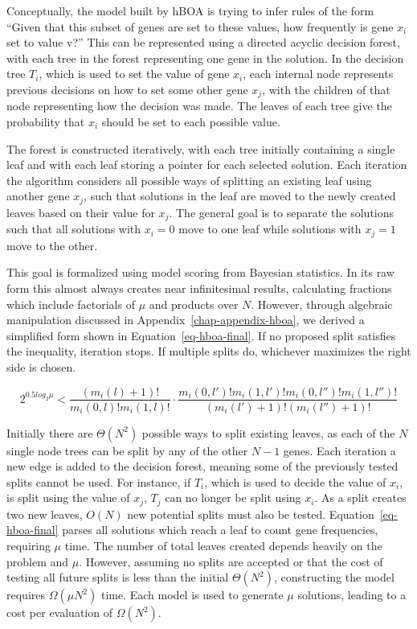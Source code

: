 Conceptually, the model built by hBOA is trying to infer rules of the form ``Given that this
subset of genes are set to these values, how frequently is gene $x_i$ set to value v?'' This can
be represented using a directed acyclic decision forest, with each tree in the forest representing one gene
in the solution. In the decision tree $T_i$, which is used to set the value of gene $x_i$,
each internal node represents previous decisions on how to set
some other gene $x_j$, with the children of that node representing how the decision was made. The
leaves of each tree give the probability that $x_i$ should be set to each possible value.

The forest is constructed iteratively, with each tree initially containing a single leaf
and with each leaf storing a pointer for each selected solution. Each iteration the algorithm considers
all possible ways of splitting an existing leaf using another gene $x_j$, such that solutions in the
leaf are moved to the newly created leaves based on their value for $x_j$. The general goal is to
separate the solutions such that all solutions with $x_i = 0$ move to one leaf while solutions with
$x_j = 1$ move to the other.

This goal is formalized using model scoring from Bayesian statistics. In its raw form this
almost always creates near infinitesimal results, calculating fractions which include factorials of $\mu$
and products over $N$. However, through algebraic manipulation discussed in Appendix~\ref{chap-appendix-hboa}, we
derived a simplified form shown in Equation~\ref{eq-hboa-final}. If no proposed split satisfies the inequality, iteration stops.
If multiple splits do, whichever maximizes the right side is chosen.

\begin{equation}
  2^{0.5 log_2\mu} < \frac{(m_i(l) + 1)!}{m_i(0, l)!m_i(1,l)!} \cdot
  \frac{m_i(0, l')!m_i(1,l')!m_i(0, l'')!m_i(1,l'')!}{(m_i(l') + 1)!(m_i(l'') + 1)!}
  \label{eq-hboa-final}
\end{equation}

Initially there are $\Theta(N^2)$ possible ways to split existing leaves, as each of the $N$ single node
trees can be split by any of the other $N-1$ genes. Each iteration a new edge is added to the decision
forest, meaning some of the previously tested splits cannot be used. For instance, if $T_i$, which is used
to decide the value of $x_i$, is split using the value of $x_j$, $T_j$ can no longer be split using $x_i$.
As a split creates two new leaves, $O(N)$ new potential splits must also be tested. Equation~\ref{eq-hboa-final}
parses all solutions which reach a leaf to count gene frequencies, requiring $\mu$ time.
The number of total leaves created depends heavily on the problem and $\mu$.
However, assuming no splits are accepted or that the cost of testing all future splits is less than
the initial $\Theta(N^2)$, constructing the model requires $\Omega(\mu N^2)$ time. Each
model is used to generate $\mu$ solutions, leading to a cost per evaluation of $\Omega(N^2)$.

